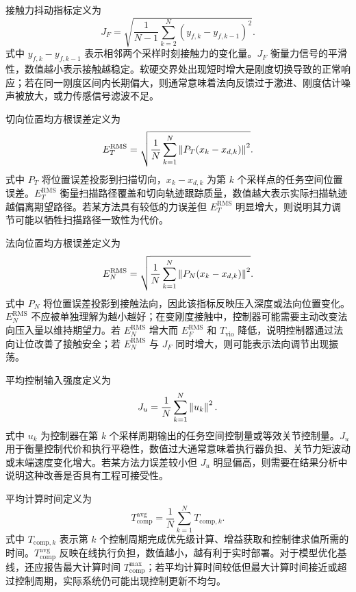 接触力抖动指标定义为
\begin{equation}
  J_F
  =\sqrt{\frac{1}{N-1}\sum_{k=2}^{N}(y_{f,k}-y_{f,k-1})^2}.
  \label{eq:ch3_metric_safety}
\end{equation}
式中 $y_{f,k}-y_{f,k-1}$ 表示相邻两个采样时刻接触力的变化量。$J_F$ 衡量力信号的平滑性，数值越小表示接触越稳定。软硬交界处出现短时增大是刚度切换导致的正常响应；若在同一刚度区间内长期偏大，则通常意味着法向反馈过于激进、刚度估计噪声被放大，或力传感信号滤波不足。

切向位置均方根误差定义为
\begin{equation}
  E_T^{\mathrm{RMS}}
  =\sqrt{\frac{1}{N}\sum_{k=1}^{N}\left\lVert P_T(x_k-x_{d,k})\right\rVert^2}.
  \label{eq:ch3_metric_tangent}
\end{equation}
式中 $P_T$ 将位置误差投影到扫描切向，$x_k-x_{d,k}$ 为第 $k$ 个采样点的任务空间位置误差。$E_T^{\mathrm{RMS}}$ 衡量扫描路径覆盖和切向轨迹跟踪质量，数值越大表示实际扫描轨迹越偏离期望路径。若某方法具有较低的力误差但 $E_T^{\mathrm{RMS}}$ 明显增大，则说明其力调节可能以牺牲扫描路径一致性为代价。

法向位置均方根误差定义为
\begin{equation}
  E_N^{\mathrm{RMS}}
  =\sqrt{\frac{1}{N}\sum_{k=1}^{N}\left\lVert P_N(x_k-x_{d,k})\right\rVert^2}.
  \label{eq:ch3_metric_normal}
\end{equation}
式中 $P_N$ 将位置误差投影到接触法向，因此该指标反映压入深度或法向位置变化。$E_N^{\mathrm{RMS}}$ 不应被单独理解为越小越好；在变刚度接触中，控制器可能需要主动改变法向压入量以维持期望力。若 $E_N^{\mathrm{RMS}}$ 增大而 $E_F^{\mathrm{RMS}}$ 和 $T_{\mathrm{vio}}$ 降低，说明控制器通过法向让位改善了接触安全；若 $E_N^{\mathrm{RMS}}$ 与 $J_F$ 同时增大，则可能表示法向调节出现振荡。

平均控制输入强度定义为
\begin{equation}
  J_u
  =\frac{1}{N}\sum_{k=1}^{N}\left\lVert u_k\right\rVert^2.
  \label{eq:ch3_metric_input}
\end{equation}
式中 $u_k$ 为控制器在第 $k$ 个采样周期输出的任务空间控制量或等效关节控制量。$J_u$ 用于衡量控制代价和执行平稳性，数值过大通常意味着执行器负担、关节力矩波动或末端速度变化增大。若某方法力误差较小但 $J_u$ 明显偏高，则需要在结果分析中说明这种改善是否具有工程可接受性。

平均计算时间定义为
\begin{equation}
  T_{\mathrm{comp}}^{\mathrm{avg}}
  =\frac{1}{N}\sum_{k=1}^{N}T_{\mathrm{comp},k}.
  \label{eq:ch3_metric_comp_avg}
\end{equation}
式中 $T_{\mathrm{comp},k}$ 表示第 $k$ 个控制周期完成优先级计算、增益获取和控制律求值所需的时间。$T_{\mathrm{comp}}^{\mathrm{avg}}$ 反映在线执行负担，数值越小，越有利于实时部署。对于模型优化基线，还应报告最大计算时间 $T_{\mathrm{comp}}^{\max}$；若平均计算时间较低但最大计算时间接近或超过控制周期，实际系统仍可能出现控制更新不均匀。


